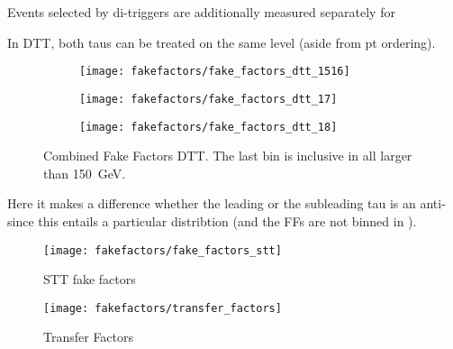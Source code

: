 Events selected by di-\tauhadvis triggers are additionally measured
separately for

In DTT, both taus can be treated on the same level (aside from pt
ordering).



\begin{figure}[htbp]
  \centering

  \begin{subfigure}{0.49\textwidth}
    \texttt{[image: fakefactors/fake\_factors\_dtt\_1516]}
  \end{subfigure}
  \begin{subfigure}{0.49\textwidth}
    \texttt{[image: fakefactors/fake\_factors\_dtt\_17]}
  \end{subfigure}

  \begin{subfigure}{0.49\textwidth}
    \texttt{[image: fakefactors/fake\_factors\_dtt\_18]}
  \end{subfigure}

  \caption{Combined Fake Factors DTT. The last bin is inclusive in all
    \pT larger than \SI{150}{\GeV}.}
  \label{fig:mjfakes_fake_factors}
\end{figure}



Here it makes a difference whether the leading or the subleading tau
is an anti-\tauhadvis since this entails a particular \pT distribtion
(and the FFs are not binned in \pT).



\begin{figure}[htbp]
  \centering

  \texttt{[image: fakefactors/fake\_factors\_stt]}


  \caption{STT fake factors}
  \label{fig:mjfakes_stt_ffs}
\end{figure}


\begin{figure}[htbp]
  \centering

  \texttt{[image: fakefactors/transfer\_factors]}

  \caption{Transfer Factors}
  \label{fig:mjfakes_transfer_factor}
\end{figure}



